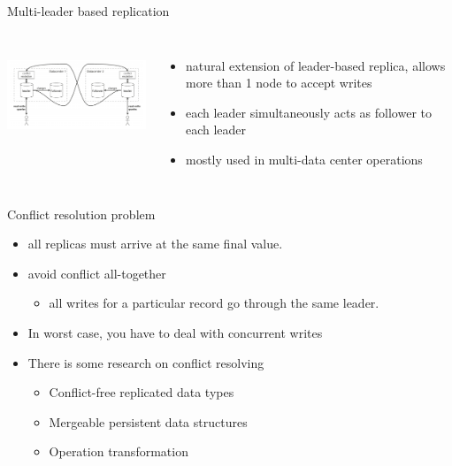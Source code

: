 \documentclass[9pt]{beamer}
\begin{document}

\begin{frame}{Multi-leader based replication}
  \begin{columns}
    \includegraphics[width=70mm, height=30mm, scale=0.1]{img/replica/multi_leader_replication.png}

    \begin{itemize}
      \pause
      \item natural extension of leader-based replica, allows more than 1 node to accept writes
      \pause
      \item each leader simultaneously acts as follower to each leader
      \pause
      \item mostly used in multi-data center operations
    \end{itemize}
  \end{columns}
\end{frame}


\begin{frame}{Conflict resolution problem}
  \begin{itemize}
    \pause
    \item all replicas must arrive at the same final value.
    \item avoid conflict all-together
      \pause
      \begin{itemize}
        \item all writes for a particular record go through the same leader.
      \end{itemize}
    \item In worst case, you have to deal with concurrent writes
      \pause
    \item There is some research on conflict resolving
      \begin{itemize}
        \item Conflict-free replicated data types
        \item Mergeable persistent data structures
        \item Operation transformation
      \end{itemize}
  \end{itemize}
\end{frame}
\end{document}
